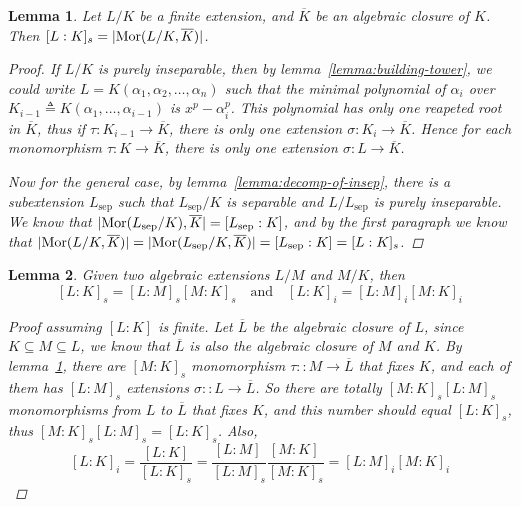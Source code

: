 \documentclass[a4paper]{article}
\DeclarePairedDelimiter{\abs}{\lvert}{\rvert}
\newcommand{\defeq}{\triangleq}
\DeclareMathOperator{\Mor}{Mor}
\newtheorem{lemma}{Lemma}
\theoremstyle{remark}
\theoremstyle{definition}
\theoremstyle{definition}
\theoremstyle{plain}
\begin{document}
  \begin{lemma} \label{lemma:number-of-ext-equal-sep-deg}
    Let $L/K$ be a finite extension, and $\overline{K}$ be an algebraic closure of $K$.
    Then $[L: K]_s = \abs{\Mor(L/K, \overline{K})}$.

    \begin{proof}
      If $L/K$ is purely inseparable, then by lemma~\ref{lemma:building-tower}, we could write
      $L = K(\alpha_1, \alpha_2, \dots, \alpha_n)$ such that the minimal polynomial of $\alpha_i$
      over $K_{i-1} \defeq K(\alpha_1, \dots, \alpha_{i-1})$ is $x^p - \alpha_i^p$.
      This polynomial has only one reapeted root in $\overline{K}$, thus if $\tau: K_{i-1} \to \overline{K}$,
      there is only one extension $\sigma: K_i \to \overline{K}$. Hence
      for each monomorphism $\tau: K \to \overline{K}$, there is only one extension $\sigma: L \to \overline{K}$.

      Now for the general case, by lemma~\ref{lemma:decomp-of-insep}, there is a subextension
      $L_\text{sep}$ such that $L_\text{sep} / K$ is separable and $L / L_\text{sep}$ is purely inseparable.
      We know that $\abs{\Mor(L_\text{sep}/K), \overline{K}} = [L_\text{sep}: K]$, and by the
      first paragraph we know that $\abs{\Mor(L/K, \overline{K})} = \abs{\Mor(L_\text{sep}/K, \overline{K})}
      = [L_\text{sep}: K] = [L: K]_s$.
    \end{proof}
  \end{lemma}

  \begin{lemma}
    Given two algebraic extensions $L/M$ and $M/K$, then
    \[ [L: K]_s = [L: M]_s [M:K]_s \quad \mathrm{and} \quad [L: K]_i = [L: M]_i [M: K]_i \]

    \begin{proof}[Proof assuming \({[L: K]}\) is finite]
      Let $\overline{L}$ be the algebraic closure of $L$, since $K \subseteq M \subseteq L$,
      we know that $\overline{L}$ is also the algebraic closure of $M$ and $K$.
      By lemma~\ref{lemma:number-of-ext-equal-sep-deg}, there are $[M: K]_s$ monomorphism
      $\tau :: M \to \overline{L}$ that fixes $K$, and each of them has $[L: M]_s$ extensions
      $\sigma :: L \to \overline{L}$. So there are totally $[M: K]_s [L: M]_s$ monomorphisms
      from $L$ to $\overline{L}$ that fixes $K$, and this number should equal $[L: K]_s$,
      thus $[M: K]_s [L: M]_s = [L: K]_s$. Also,
      \[ [L: K]_i = \frac{[L: K]}{[L: K]_s} = \frac{[L: M]_{\ }}{[L: M]_s}\frac{[M: K]_{\ }}{[M: K]_s} =
        [L: M]_i [M: K]_i \]
    \end{proof}
  \end{lemma}
\end{document}
